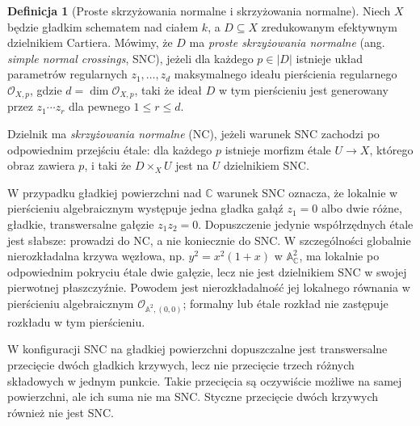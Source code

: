 \documentclass[11pt,a4paper,openany]{report}
\numberwithin{equation}{section}
\theoremstyle{plain}
\theoremstyle{definition}
\newtheorem{definicja}[twierdzenie]{Definicja}
\theoremstyle{remark}
\newcommand{\C}{\mathbb C}
\newcommand{\A}{\mathbb A}
\begin{document}
\begin{definicja}[Proste skrzyżowania normalne i skrzyżowania normalne]
\label{def:ga5-snc}
Niech $X$ będzie gładkim schematem nad ciałem $k$, a
$D\subseteq X$ zredukowanym efektywnym dzielnikiem Cartiera.
Mówimy, że $D$ ma \emph{proste skrzyżowania normalne}
(ang. \emph{simple normal crossings}, SNC), jeżeli dla każdego
$p\in |D|$ istnieje układ parametrów regularnych
$z_1,\ldots,z_d$ maksymalnego ideału pierścienia
regularnego $\mathcal O_{X,p}$, gdzie
$d=\dim\mathcal O_{X,p}$, taki że ideał $D$ w tym
pierścieniu jest generowany przez $z_1\cdots z_r$
dla pewnego $1\le r\le d$.

Dzielnik ma \emph{skrzyżowania normalne} (NC), jeżeli
warunek SNC zachodzi po odpowiednim przejściu étale:
dla każdego $p$ istnieje morfizm étale $U\to X$,
którego obraz zawiera $p$, i taki że $D\times_XU$ jest
na $U$ dzielnikiem SNC.
\end{definicja}

W przypadku gładkiej powierzchni nad $\C$ warunek SNC
oznacza, że lokalnie w pierścieniu algebraicznym występuje
jedna gładka gałąź $z_1=0$ albo dwie różne, gładkie,
transwersalne gałęzie $z_1z_2=0$. Dopuszczenie jedynie
współrzędnych étale jest słabsze: prowadzi do NC, a nie
koniecznie do SNC. W szczególności globalnie nierozkładalna
krzywa węzłowa, np. $y^2=x^2(1+x)$ w $\A^2_{\C}$,
ma lokalnie po odpowiednim pokryciu étale dwie gałęzie,
lecz nie jest dzielnikiem SNC w swojej pierwotnej
płaszczyźnie. Powodem jest nierozkładalność jej lokalnego
równania w pierścieniu algebraicznym
$\mathcal O_{\A^2,(0,0)}$; formalny lub étale rozkład
nie zastępuje rozkładu w tym pierścieniu.

W konfiguracji SNC na gładkiej powierzchni dopuszczalne jest
transwersalne przecięcie dwóch gładkich krzywych, lecz nie
przecięcie trzech różnych składowych w jednym punkcie.
Takie przecięcia są oczywiście możliwe na samej powierzchni,
ale ich suma nie ma SNC. Styczne przecięcie dwóch krzywych
również nie jest SNC.
\end{document}
